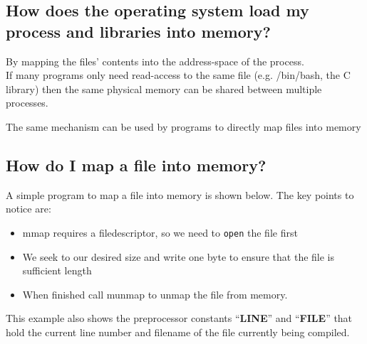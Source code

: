 \subsection{How does the operating system load my process and libraries
into
memory?}\label{how-does-the-operating-system-load-my-process-and-libraries-into-memory}

By mapping the files' contents into the address-space of the
process.\\If many programs only need read-access to the same file (e.g.
/bin/bash, the C library) then the same physical memory can be shared
between multiple processes.

The same mechanism can be used by programs to directly map files into
memory

\subsection{How do I map a file into
memory?}\label{how-do-i-map-a-file-into-memory}

A simple program to map a file into memory is shown below. The key
points to notice are:

\begin{itemize}
\itemsep1pt\parskip0pt
\item
  mmap requires a filedescriptor, so we need to \texttt{open} the file
  first
\item
  We seek to our desired size and write one byte to ensure that the file
  is sufficient length
\item
  When finished call munmap to unmap the file from memory.
\end{itemize}

This example also shows the preprocessor constants ``\textbf{LINE}'' and
``\textbf{FILE}'' that hold the current line number and filename of the
file currently being compiled.

